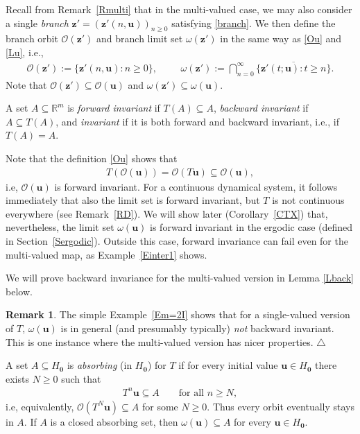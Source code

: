 \documentclass[11pt,reqno,tbtags,a4paper]{amsart}
\numberwithin{equation}{section}
\renewcommand\ge{\geq}
\renewcommand\geq{\geqslant}
\theoremstyle{plain}%
\theoremstyle{definition}
\newcommand\xqed[1]{%
    \leavevmode\unskip\penalty9999 \hbox{}\nobreak\hfill
    \quad\hbox{#1}}
\newtheorem{remarkqqq}[theorem]{Remark}
\newenvironment{remark}{\begin{remarkqqq}}
  {\xqed{$\triangle$}\end{remarkqqq}}
\theoremstyle{remark}
\newcommand{\refC}[1]{Corollary~\ref{#1}}
\newcommand{\refR}[1]{Remark~\ref{#1}}
\newcommand{\refS}[1]{Section~\ref{#1}}
\newcommand{\refE}[1]{Example~\ref{#1}}
\newcommand\set[1]{\ensuremath{\{#1\}}}
\newcommand\punkt{\xperiod}    %
\newcommand\ie{i.e\punkt}
\newcommand\bbR{\mathbb R}
\newcommand\go{\omega}
\newcommand\cL{{\omega}}
\newcommand\cO{\mathcal O}
\newcommand\Ho{H_{\0}}
\newcommand\vu{\mathbf{u}}
\newcommand\vz{\mathbf{z}}
\newcommand\0{{\boldsymbol 0}}
\newcommand\1{{\boldsymbol 1}}
\begin{document}
Recall from \refR{Rmulti} that
in the multi-valued case,
we may also consider a single \emph{branch}
$\vz'=(\vz'(n,\vu))_{n\ge0}$ satisfying \eqref{branch}.
We then define the branch orbit $\cO(\vz')$
and branch limit set $\omega(\vz')$ 
in the same way as \eqref{Ou} and \eqref{Lu},
i.e.,
\begin{align}
\cO(\vz') :=\set{\vz'(n,\vu):n\ge0},
&&&
\omega(\vz'):=\bigcap_{n=0}^\infty\overline{\set{\vz'(t;\vu):t\ge n}}.
\end{align}
Note that 
$\cO(\vz')\subseteq\cO(\vu)$
and
$\go(\vz')\subseteq\cL(\vu)$.

 A set $A\subseteq \bbR^m$ is 
\emph{forward invariant}  if $T(A)\subseteq A$,
\emph{backward invariant}  if $A\subseteq T(A)$,
and
\emph{invariant} if it is both forward and backward invariant, i.e.,
if $T(A)=A$. 

Note that the definition \eqref{Ou} shows that 
\begin{align}\label{cO2}
T(\cO(\vu))=\cO(T\vu)\subseteq\cO(\vu),  
\end{align}
\ie, $\cO(\vu)$ is forward invariant.
For a continuous dynamical system, it follows immediately that also the
limit set is forward invariant, but $T$ is not continuous everywhere (see
\refR{RD}).
We will show later (\refC{CTX}) that, nevertheless,
the limit set $\cL(\vu)$ is forward invariant
in the ergodic case (defined in \refS{Sergodic}).
Outside this case, forward invariance can fail even for the multi-valued
map, as \refE{Einter1} shows.

We will prove backward invariance for the multi-valued version
in Lemma \ref{Lback} below.

\begin{remark}\label{Rnoback}
  The simple \refE{Em=2I}
shows that 
for a single-valued version of $T$,
$\cL(\vu)$ is in general (and presumably typically)
\emph{not} backward invariant.
This is one instance where the multi-valued version has nicer properties. 
\end{remark}

A set $A\subseteq\Ho$ is \emph{absorbing} 
(in $\Ho$) 
for $T$ if for every initial value
$\vu\in\Ho$ there exists $N\ge0$ such that
\begin{align}
  T^n\vu \subseteq A \qquad \text{for all }n\ge N,
\end{align}
\ie, equivalently, $\cO(T^N\vu)\subseteq A$ for some $N\ge0$.
Thus every orbit eventually stays in $A$.
If $A$ is a closed absorbing set, then $\cL(\vu)\subseteq A$ for every
$\vu\in\Ho$.
\end{document}
